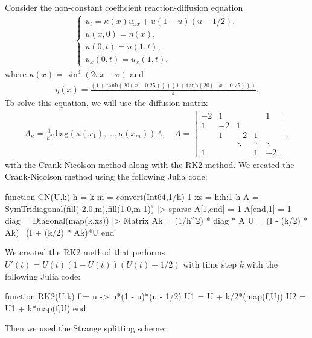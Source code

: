 \documentclass[12pt]{report}
\begin{document}
\begin{solution}

    \noindent
    Consider the non-constant coefficient reaction-diffusion equation
    \begin{align*}
      \begin{cases}
        u_t = \kappa(x) u_{xx} + u(1-u)(u-1/2),\\
        u(x,0) = \eta(x),\\
        u(0,t) = u(1,t),\\
        u_x(0,t) = u_x(1,t),
      \end{cases}
    \end{align*}
    where $\kappa(x) = \sin^4(2\pi x - \pi)$ and
    \begin{align*}
      \eta(x) = \frac{ ( 1 + \mathrm{tanh}(20(x-0.25)) ) ( 1 + \mathrm{tanh}(20(-x+0.75)))}{4}.
    \end{align*}
    To solve this equation, we will use the diffusion matrix 
    \begin{align*}
      A_{\kappa} = \frac{1}{h^2} \mathrm{diag}(\kappa(x_1),\ldots,\kappa(x_m)) A, \quad A  = \begin{bmatrix}
  -2  & 1 &&& 1\\
  1 & -2 & 1 \\
  & 1 & -2 & 1\\
  && \ddots & \ddots & \ddots \\
  1&&& 1 & -2 \end{bmatrix},
    \end{align*}
    with the Crank-Nicolson method along with the RK2 method. We created the Crank-Nicolson method using the following Julia code:
    \begin{python}
    function CN(U,k)
      h = k
      m = convert(Int64,1/h)-1
      xs = h:h:1-h
      A = SymTridiagonal(fill(-2.0,m),fill(1.0,m-1)) |> sparse
      A[1,end] = 1
      A[end,1] = 1
      diag = Diagonal(map(k,xs)) |> Matrix
      Ak = (1/h^2) * diag * A
      U = (I - (k/2) * Ak) \ (I + (k/2) * Ak)*U    
    end
    \end{python}
    We created the RK2 method that performs $U'(t) = U(t)(1-U(t))(U(t) - 1/2)$ with time step $k$ with the following Julia code:
    \begin{python}
    function RK2(U,k)
      f = u -> u*(1 - u)*(u - 1/2)
      U1 = U + k/2*(map(f,U))
      U2 = U1 + k*map(f,U)
    end
    \end{python}
    Then we used the Strange splitting scheme:
    \begin{verbatim}

\end{verbatim}
\end{solution}
\end{document}
